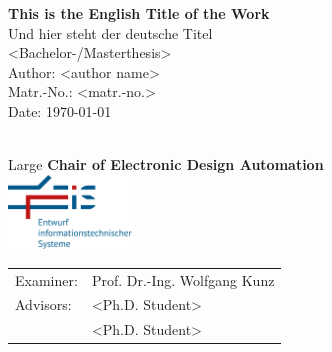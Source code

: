 \begin{titlepage} %

    \centering %
	\vspace*{3\baselineskip} %
	
	\textcolor{rptudunkelblau}{\LARGE \textbf{This is the English Title of the Work}\\} 
	\vspace{1\baselineskip} %
	\textcolor{rptudunkelblau}{\Large Und hier steht der deutsche Titel\\} 
	\vspace{5\baselineskip} %
	\textcolor{rptudunkelblau}{\Large <Bachelor-/Masterthesis>\\} 
	\vspace{1\baselineskip} %
	\textcolor{rptudunkelblau}{\Large Author: <author name>\\} 
	\vspace{1\baselineskip} %
	\textcolor{rptudunkelblau}{\Large Matr.-No.: <matr.-no.>\\} 
	\vspace{1\baselineskip} %
	\textcolor{rptudunkelblau}{\Large Date: \today\\} 
	
	\vspace{4\baselineskip} %
	\textcolor{rptudunkelblau}{\\Large \textbf{Chair of Electronic Design Automation}\\}
	\vspace{1\baselineskip}
    \includegraphics[width=0.25\textwidth]{images/EIS-Logo.png}\\
    \vspace{3\baselineskip}
	\textcolor{rptudunkelblau}{\Large \begin{tabular}{ll}
		Examiner: & Prof. Dr.-Ing. Wolfgang Kunz\\
		Advisors: & <Ph.D. Student>\\
		& <Ph.D. Student>
	\end{tabular}}
	
\end{titlepage}
